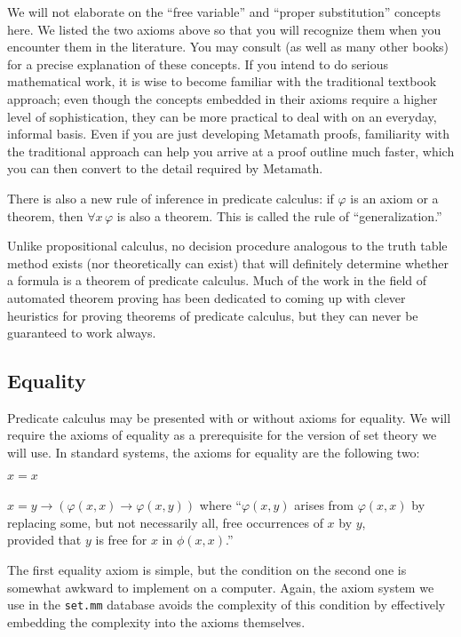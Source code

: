 We will not elaborate on the ``free variable'' and ``proper substitution''
concepts here.  We listed the two axioms above so that you will recognize them
when you encounter them in the literature. You may consult
\cite[ch.\ 3--4]{Hamilton} (as well as
many other books) for a precise explanation
of these concepts.  If you intend to do serious mathematical work, it is wise
to become familiar with the traditional textbook approach; even though the
concepts embedded in their axioms require a higher level of sophistication,
they can be more practical to deal with on an everyday, informal basis.  Even
if you are just developing Metamath proofs, familiarity with the traditional
approach can help you arrive at a proof outline much faster, which you can
then convert to the detail required by Metamath.

There is also a new rule of inference in predicate calculus:  if $\varphi$ is
an axiom or a theorem, then $\forall x \,\varphi$ is also a
theorem.  This is called the rule of
``generalization.''

Unlike propositional calculus, no decision procedure
analogous to the truth table method exists (nor theoretically can exist) that
will definitely determine whether a formula is a theorem of predicate
calculus.  Much of the work in the field of automated theorem
proving has been dedicated to coming up with
clever heuristics for proving theorems of predicate calculus, but they can
never be guaranteed to work always.

\subsection{Equality}

Predicate calculus may be presented with or without axioms for
equality. We will require the
axioms of equality as a prerequisite for the version of set theory we will
use.  In standard systems, the axioms for equality are the following two:
\begin{center}
$x=x$\\ \ \\
$x=y\rightarrow (\varphi(x,x)\rightarrow\varphi(x,y))$ where ``$\varphi(x,y)$
   arises from $\varphi(x,x)$ by replacing some, but not necessarily all,
   free
   occurrences of $x$ by $y$,\\ provided that $y$ is free for $x$
   in $\phi(x,x)$.'' \end{center}
The first equality axiom is simple, but the condition on the second one is
somewhat awkward to implement on a computer.  Again, the axiom system we use in
the \texttt{set.mm} database avoids the
complexity of this condition by effectively embedding the complexity into the
axioms themselves.

